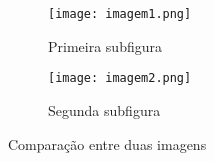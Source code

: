 

\begin{figure}[htbp]
    \centering
    \begin{subfigure}[b]{0.45\textwidth}
        \centering
        \texttt{[image: imagem1.png]}
        \caption{Primeira subfigura}
        \label{fig:sub1}
    \end{subfigure}
    \hfill
    \begin{subfigure}[b]{0.45\textwidth}
        \centering
        \texttt{[image: imagem2.png]}
        \caption{Segunda subfigura}
        \label{fig:sub2}
    \end{subfigure}
    \caption{Comparação entre duas imagens}
    \label{fig:comparacao}
\end{figure}



